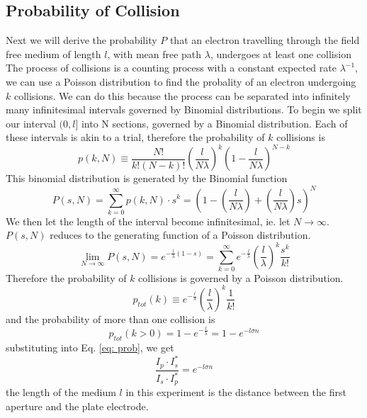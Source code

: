 \documentclass{article}
\begin{document}
\subsection{Probability of Collision}
\indent Next we will derive the probability $P$ that an electron travelling through the field free medium of length $l$, with mean free path $\lambda$, undergoes at least one collision The process of collisions is a counting process with a constant expected rate $\lambda^{-1}$, we can use a Poisson distribution to find the probality of an electron undergoing $k$ collisions. We can do this because the process can be separated into infinitely many infinitesimal intervals governed by Binomial distributions. To begin we split our interval $(0,l]$ into N sections, governed by a Binomial distribution. Each of these intervals is akin to a trial, therefore the probability of $k$ collisions is\\
\begin{equation}
p(k, N) \equiv \frac{N!}{k!(N-k)!}\left(\frac{l}{N\lambda}\right)^k\left(1-\frac{l}{N\lambda}\right)^{N-k}
\end{equation}
This binomial distribution is generated by the Binomial function 
\begin{equation}
P(s, N) =\sum_{k=0}^{\infty}p(k,N)\cdot s^k = \left(1-\left(\frac{l}{N\lambda}\right) + \left(\frac{l}{N\lambda}\right)s\right)^N
\end{equation}
We then let the length of the interval become infinitesimal, ie. let $N \rightarrow \infty$. $P(s, N)$ reduces to the generating function of a Poisson distribution.
\begin{equation}
\lim_{N\rightarrow\infty} P(s,N) = e^{-\frac{l}{\lambda}(1-s)}=\sum_{k=0}^{\infty}e^{-\frac{l}{\lambda}}\left(\frac{l}{\lambda}\right)^k\frac{s^k}{k!}
\end{equation}
Therefore the probability of $k$ collisions is governed by a Poisson distribution.
\begin{equation}
p_{tot}(k)\equiv e^{-\frac{l}{\lambda}}\left(\frac{l}{\lambda}\right)^k\frac{1}{k!}
\end{equation}
and the probability of more than one collision is
\begin{equation}
p_{tot}(k>0)=1-e^{-\frac{l}{\lambda}}=1-e^{-l\sigma n}
\label{eq: prob2}
\end{equation}
substituting into Eq. \ref{eq: prob}, we get
\begin{equation}
\frac{I_p\cdot I^*_s}{I_s\cdot I^*_p} = e^{-l\sigma n}
\end{equation}
the length of the medium $l$ in this experiment is the distance between the first aperture and the plate electrode.\\
\end{document}
